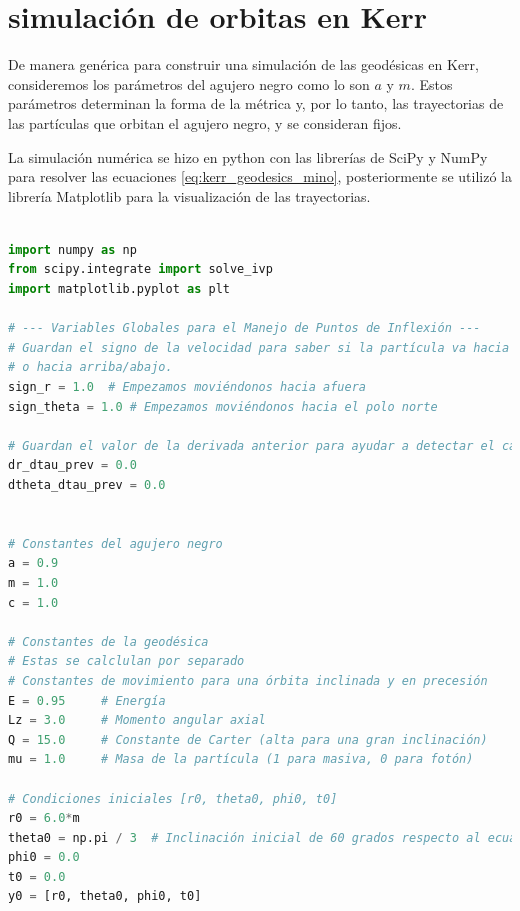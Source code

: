 \section{simulación de orbitas en Kerr}
De manera genérica para construir una simulación de las geodésicas en Kerr, consideremos los parámetros del agujero negro como lo son $a$ y $m$. Estos parámetros determinan la forma de la métrica y, por lo tanto, las trayectorias de las partículas que orbitan el agujero negro, y se consideran fijos.

La simulación numérica se hizo en python con las librerías de SciPy y NumPy para resolver las ecuaciones \ref{eq:kerr_geodesics_mino}, posteriormente se utilizó la librería Matplotlib para la visualización de las trayectorias.


\begin{lstlisting}[language=Python, caption= {Este es el código genérico para la simulación de geodésicas en el espacio-tiempo de Kerr, se fijaron valores para las constantes $E$ y $L_z$, posiciones iniciales para $r$, $\theta$, $\phi$ y $t$. Además se uso la constante de masa $\mu$ a 1, asi como también $c$ a 1.Posteriormente se puede usar Matplotlib para ver las trayectorias, se puede encontar el codigo completo en los anexos \ref{chap:programa_geodesicas}.}]

import numpy as np
from scipy.integrate import solve_ivp
import matplotlib.pyplot as plt

# --- Variables Globales para el Manejo de Puntos de Inflexión ---
# Guardan el signo de la velocidad para saber si la partícula va hacia adentro/afuera
# o hacia arriba/abajo.
sign_r = 1.0  # Empezamos moviéndonos hacia afuera
sign_theta = 1.0 # Empezamos moviéndonos hacia el polo norte

# Guardan el valor de la derivada anterior para ayudar a detectar el cambio de signo.
dr_dtau_prev = 0.0
dtheta_dtau_prev = 0.0


# Constantes del agujero negro
a = 0.9
m = 1.0
c = 1.0

# Constantes de la geodésica
# Estas se calclulan por separado
# Constantes de movimiento para una órbita inclinada y en precesión
E = 0.95     # Energía 
Lz = 3.0     # Momento angular axial
Q = 15.0     # Constante de Carter (alta para una gran inclinación)
mu = 1.0     # Masa de la partícula (1 para masiva, 0 para fotón)

# Condiciones iniciales [r0, theta0, phi0, t0]
r0 = 6.0*m
theta0 = np.pi / 3  # Inclinación inicial de 60 grados respecto al ecuador
phi0 = 0.0
t0 = 0.0
y0 = [r0, theta0, phi0, t0]



\end{lstlisting}
